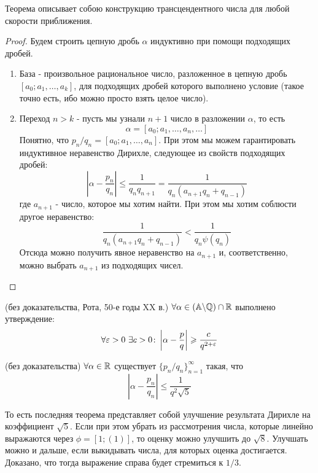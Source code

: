 \begin{note}
	Теорема описывает собою конструкцию трансцендентного числа для любой скорости приближения.
\end{note}

\begin{proof}
	Будем строить цепную дробь $\alpha$ индуктивно при помощи подходящих дробей.
	\begin{enumerate}
		\item База - произвольное рациональное число, разложенное в цепную дробь $[a_0; a_1, \ldots, a_k]$, для подходящих дробей которого выполнено условие (такое точно есть, ибо можно просто взять целое число).
		\item Переход $n > k$ - пусть мы узнали $n + 1$ число в разложении $\alpha$, то есть
		\[
			\alpha = [a_0; a_1, \ldots, a_n, \ldots]
		\]
		Понятно, что $p_n/q_n = [a_0; a_1, \ldots, a_n]$. При этом мы можем гарантировать индуктивное неравенство Дирихле, следующее из свойств подходящих дробей:
		\[
			\left|\alpha - \frac{p_n}{q_n}\right| \le \frac{1}{q_n q_{n + 1}} = \frac{1}{q_n (a_{n + 1}q_n + q_{n - 1})}
		\]
		где $a_{n + 1}$ - число, которое мы хотим найти. При этом мы хотим соблюсти другое неравенство:
		\[
			\frac{1}{q_n (a_{n + 1} q_n + q_{n - 1})} < \frac{1}{q_n \psi(q_n)}
		\]
		Отсюда можно получить явное неравенство на $a_{n + 1}$ и, соответственно, можно выбрать $a_{n + 1}$ из подходящих чисел.
	\end{enumerate}
\end{proof}

\begin{theorem} (без доказательства, Рота, 50-е годы XX в.)
	$\forall \alpha \in (\mathbb{A} \backslash \mathbb{Q}) \cap \mathbb{R}$ выполнено утверждение:
	\[
		\forall \eps > 0\ \exists c > 0 \colon \left|\alpha - \frac{p}{q}\right| \ge \frac{c}{q^{2 + \eps}}
	\]
\end{theorem}

\begin{theorem} (без доказательства)
	$\forall \alpha \in \mathbb{R}$ существует $\{p_n/q_n\}_{n = 1}^\infty$ такая, что
	\[
		\left|\alpha - \frac{p_n}{q_n}\right| \le \frac{1}{q^2 \sqrt{5}}
	\]
\end{theorem}

\begin{note}
	То есть последняя теорема представляет собой улучшение результата Дирихле на коэффициент $\sqrt{5}$. Если при этом убрать из рассмотрения числа, которые линейно выражаются через $\phi = [1; (1)]$, то оценку можно улучшить до $\sqrt{8}$. Улучшать можно и дальше, если выкидывать числа, для которых оценка достигается. Доказано, что тогда выражение справа будет стремиться к $1/3$.
\end{note}